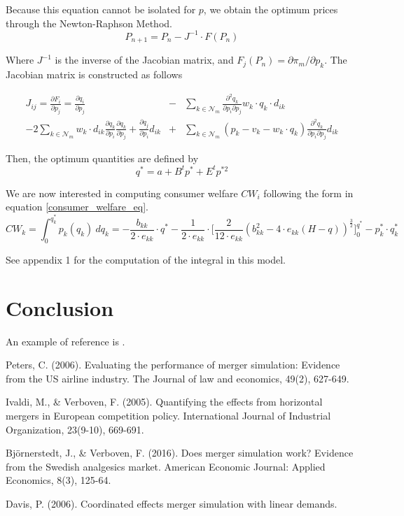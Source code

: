 \documentclass[12pt]{article}
\begin{document}
Because this equation cannot be isolated for $p$, we obtain the optimum prices through the Newton-Raphson Method.
\begin{equation*}
P_{n+1} = P_n - J^{-1} \cdot F(P_n)
\end{equation*}

Where $J^{-1}$ is the inverse of the Jacobian matrix, and $F_j(P_n) = \partial \pi_m / \partial p_k$. The Jacobian matrix is constructed as follows

\begin{eqnarray*}
J_{ij} = \frac{\partial F_i}{\partial p_j} = \frac{\partial q_i}{\partial p_j} &-& \sum_{k \in \mathcal{N}_m} \frac{\partial^2 q_k}{\partial p_i \partial p_j} w_k \cdot q_k \cdot d_{ik}\\
 - 2\sum_{k \in \mathcal{N}_m} w_k \cdot d_{ik} \frac{\partial q_k}{\partial p_i} \frac{\partial q_k}{\partial p_j} + \frac{\partial q_j}{\partial p_i} d_{ik} &+& \sum_{k \in \mathcal{N}_m} (p_k - v_k - w_k \cdot q_k) \frac{\partial^2 q_k}{\partial p_i \partial p_j}d_{ik}
\end{eqnarray*}

Then, the optimum quantities are defined by 
\begin{equation*}
q^* = a + B^t p^* + E^t p^{*2}
\end{equation*}

We are now interested in computing consumer welfare $CW_i$ following the form in equation \ref{consumer_welfare_eq}.
\begin{equation*}
CW_k = \int_0^{q_k^*} p_k(q_k) \ dq_k = -\frac{b_{kk}}{2 \cdot e_{kk}} \cdot q^* -\frac{1}{2 \cdot e_{kk}} \cdot \bigg[\frac{2}{12 \cdot e_{kk}} (b_{kk}^2 - 4 \cdot e_{kk}(H - q))^{\frac{3}{2}}\bigg]_0^{q^*} - p_k^* \cdot q_k^*
\end{equation*}

See appendix 1 for the computation of the integral in this model.  

\section{Conclusion}

An example of reference is \cite{abc}.

\newpage
\begin{thebibliography}{9}

Peters, C. (2006). Evaluating the performance of merger simulation: Evidence from the US airline industry. The Journal of law and economics, 49(2), 627-649.

Ivaldi, M., \& Verboven, F. (2005). Quantifying the effects from horizontal mergers in European competition policy. International Journal of Industrial Organization, 23(9-10), 669-691.

Bj\"{o}rnerstedt, J., \& Verboven, F. (2016). Does merger simulation work? Evidence from the Swedish analgesics market. American Economic Journal: Applied Economics, 8(3), 125-64.

Davis, P. (2006). Coordinated effects merger simulation with linear demands.
\end{thebibliography}
\end{document}
